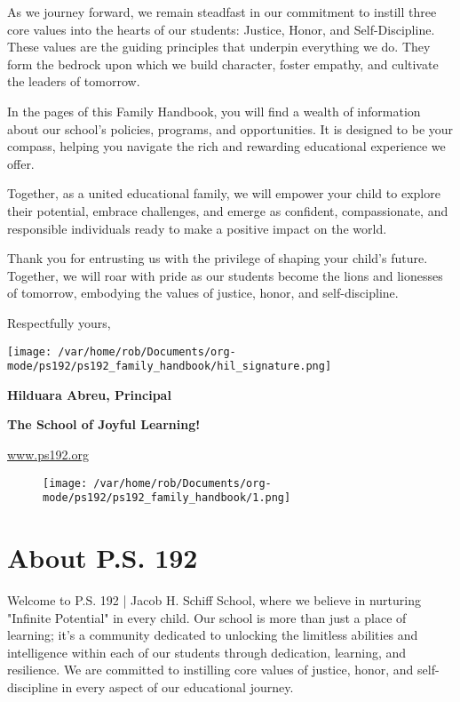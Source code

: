 \documentclass[11pt]{article}
\begin{document}
As we journey forward, we remain steadfast in our commitment to instill three core values into the hearts of our students: Justice, Honor, and Self-Discipline. These values are the guiding principles that underpin everything we do. They form the bedrock upon which we build character, foster empathy, and cultivate the leaders of tomorrow.

In the pages of this Family Handbook, you will find a wealth of information about our school’s policies, programs, and opportunities. It is designed to be your compass, helping you navigate the rich and rewarding educational experience we offer.

Together, as a united educational family, we will empower your child to explore their potential, embrace challenges, and emerge as confident, compassionate, and responsible individuals ready to make a positive impact on the world.

Thank you for entrusting us with the privilege of shaping your child’s future. Together, we will roar with pride as our students become the lions and lionesses of tomorrow, embodying the values of justice, honor, and self-discipline.

Respectfully yours,

\texttt{[image: /var/home/rob/Documents/org-mode/ps192/ps192\_family\_handbook/hil\_signature.png]}

\textbf{\textbf{Hilduara Abreu, Principal}}

\textbf{\textbf{The School of Joyful Learning!}}

\href{https://www.ps192.org}{www.ps192.org}

\begin{figure}[b]  %
  \centering
  \texttt{[image: /var/home/rob/Documents/org-mode/ps192/ps192\_family\_handbook/1.png]}
  \label{fig:fronpage bottom_image}
\end{figure}

\clearpage

\section{About P.S. 192}
\label{sec:org6f0a755}

Welcome to P.S. 192 | Jacob H. Schiff School, where we believe in nurturing "Infinite Potential" in every child. Our school is more than just a place of learning; it’s a community dedicated to unlocking the limitless abilities and intelligence within each of our students through dedication, learning, and resilience. We are committed to instilling core values of justice, honor, and self-discipline in every aspect of our educational journey.
\end{document}
